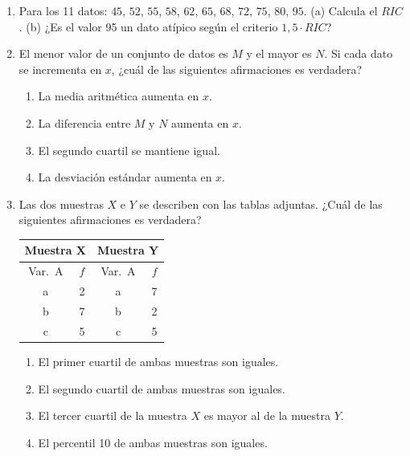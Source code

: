\documentclass[11pt, letterpaper]{article}
\begin{document}
\begin{enumerate}[label=\textbf{\arabic*.}, leftmargin=*, resume]
  \item Para los 11 datos: $45$, $52$, $55$, $58$, $62$, $65$, $68$, $72$, $75$, $80$, $95$.
  (a) Calcula el $RIC$.
  (b) ¿Es el valor 95 un dato atípico según el criterio $1{,}5 \cdot RIC$?
  \vspace{2.8cm}

  \item El menor valor de un conjunto de datos es $M$ y el mayor es $N$. Si cada dato se incrementa en $x$, ¿cuál de las siguientes afirmaciones es verdadera?
  \begin{enumerate}[label=\Alph*),leftmargin=14pt]
    \item La media aritmética aumenta en $x$.
    \item La diferencia entre $M$ y $N$ aumenta en $x$.
    \item El segundo cuartil se mantiene igual.
    \item La desviación estándar aumenta en $x$.
  \end{enumerate}

  \item Las dos muestras $X$ e $Y$ se describen con las tablas adjuntas. ¿Cuál de las siguientes afirmaciones es verdadera?
  \begin{center}
  \small
  \renewcommand{\arraystretch}{1.15}
  \begin{tabular}{|c|c||c|c|}
  \hline \multicolumn{2}{|c||}{Muestra X} & \multicolumn{2}{c|}{Muestra Y}\\\hline
  Var.\ A & $f$ & Var.\ A & $f$\\\hline
  a & 2 & a & 7\\\hline b & 7 & b & 2\\\hline c & 5 & c & 5\\\hline
  \end{tabular}
  \end{center}
  \begin{enumerate}[label=\Alph*),leftmargin=14pt]
    \item El primer cuartil de ambas muestras son iguales.
    \item El segundo cuartil de ambas muestras son iguales.
    \item El tercer cuartil de la muestra $X$ es mayor al de la muestra $Y$.
    \item El percentil 10 de ambas muestras son iguales.
  \end{enumerate}
\end{enumerate}
\end{document}
